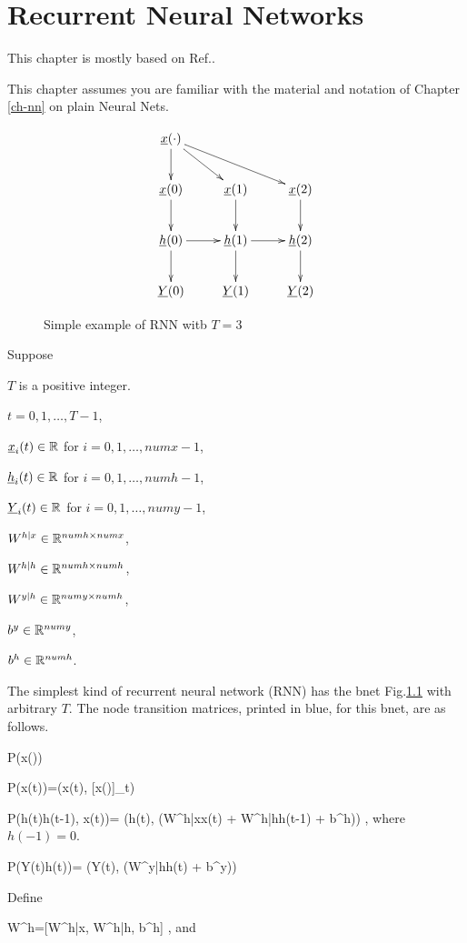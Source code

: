 \chapter{Recurrent Neural Networks}

This chapter is mostly
based on Ref.\cite{ng-rnn}.

This chapter
assumes you are
familiar 
with the material
and notation of Chapter \ref{ch-nn}
on plain Neural Nets.


\begin{figure}[h!]
\centering
$$\xymatrix{
\rvx(\cdot)\ar[d]\ar[dr]\ar[drr]\\
\rvx(0)\ar[d]&
\rvx(1)\ar[d]&
\rvx(2)\ar[d]\\
\rvh(0)\ar[d]\ar[r]&
\rvh(1)\ar[d]\ar[r]&
\rvh(2)\ar[d]\\
\rvY(0)&
\rvY(1)&
\rvY(2)
}$$
\caption{Simple example of 
RNN witb $T=3$}
\label{fig-rnn}
\end{figure}

Suppose

$T$ is a positive integer.

$t=0, 1, \ldots, T-1$,

${\underline{x}}_i(t)\in { \mathbb{R}}$ for
 $i=0,1, \ldots,numx-1$,

${\underline{h}}_i(t)\in { \mathbb{R}}$ for
 $i=0,1, \ldots,numh-1$,

${\underline{Y}}_i(t)\in { \mathbb{R}}$ for
 $i=0,1, \ldots,numy-1$,

$W^{h|x}\in{ \mathbb{R}}^{numh\times numx}$,

$W^{h|h}\in{ \mathbb{R}}^{numh\times numh}$,

$W^{y|h}\in{ \mathbb{R}}^{numy\times numh}$,

$b^y\in { \mathbb{R}}^{numy}$,

$b^h\in { \mathbb{R}}^{numh}$.

The simplest kind of
recurrent neural network (RNN)
has
the bnet Fig.\ref{fig-rnn}
with arbitrary $T$.
The node
transition matrices, printed in
blue, for this bnet, are as follows.

\beq\color{blue}
P(x(\cdot))
\eeq

\beq\color{blue}
P(x(t))=\delta(x(t), [x(\cdot)]_t)
\eeq

\beq\color{blue}
P(h(t)\cond h(t-1), x(t))=
\delta(h(t),
\cala(W^{h|x}x(t) +
 W^{h|h}h(t-1) + b^h))
\;,
\eeq
where
$h(-1)=0$.

\beq\color{blue}
P(Y(t)\cond h(t))=
\delta(Y(t),
\cala(W^{y|h}h(t) + b^y))
\eeq

Define

\beq
W^h=[W^{h|x}, W^{h|h}, b^h]
\;,
\eeq
and

